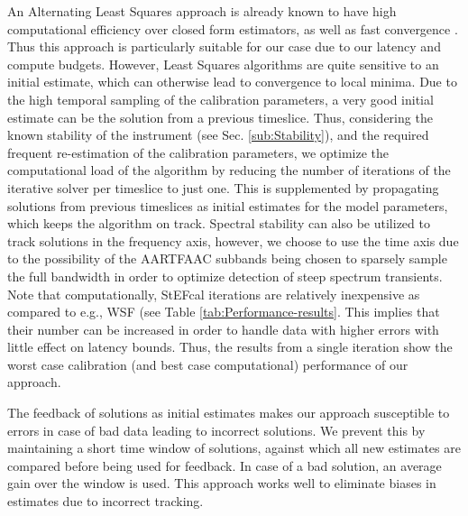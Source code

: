 \documentclass{aa}
\begin{document}
An  Alternating   Least  Squares  approach   is  already  known  to   have  high
computational  efficiency   over  closed  form  estimators,  as   well  as  fast
convergence  \citep{boonstra2003gain}.   Thus   this  approach  is  particularly
suitable for  our case due to  our latency and compute  budgets.  However, Least
Squares  algorithms  are quite  sensitive  to  an  initial estimate,  which  can
otherwise lead to convergence to local minima. Due to the high temporal sampling
of the calibration parameters, a very good initial estimate can be the solution
from  a  previous timeslice.   Thus,  considering  the  known stability  of  the
instrument   (see  Sec.    \ref{sub:Stability}),  and   the   required  frequent
re-estimation of the calibration  parameters, we optimize the computational load
of the  algorithm by reducing the  number of iterations of  the iterative solver
per timeslice  to just one. This  is supplemented by  propagating solutions from
previous timeslices as  initial estimates for the model  parameters, which keeps
the  algorithm  on track.  Spectral  stability can  also  be  utilized to  track
solutions in the frequency axis, however, we  choose to use the time axis due to
the possibility  of the  AARTFAAC subbands being  chosen to sparsely  sample the
full  bandwidth in  order to  optimize detection  of steep  spectrum transients.
Note  that computationally,  StEFcal  iterations are  relatively inexpensive  as
compared to e.g.,  WSF (see Table \ref{tab:Performance-results}. This implies that  their number can be
increased  in order  to handle  data with  higher errors  with little  effect on
latency bounds.  Thus, the results from  a single iteration show  the worst case
calibration (and best case computational) performance of our approach.

The feedback of solutions as initial estimates makes our approach susceptible to
errors in case  of bad data leading to incorrect solutions.   We prevent this by
maintaining a  short time window of  solutions, against which  all new estimates
are compared  before being  used for feedback.   In case  of a bad  solution, an
average gain  over the window  is used.  This  approach works well  to eliminate
biases in estimates due to incorrect tracking.
\end{document}
